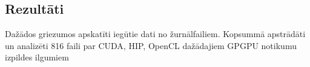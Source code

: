 \begin{center}
    \chapter{Rezultāti}
\end{center}

Dažādos griezumos apskatīti iegūtie dati no žurnālfailiem.
Kopsummā apstrādāti un analizēti 816 faili par CUDA, HIP, OpenCL
dažādajiem GPGPU notikumu izpildes ilgumiem
